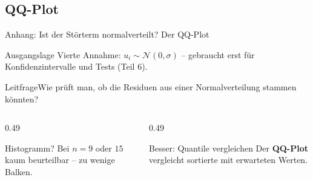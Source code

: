 \documentclass[aspectratio=169,11pt]{beamer}
\newcommand{\leitfrage}[1]{\begin{exampleblock}{Leitfrage}#1\end{exampleblock}}
\begin{document}
\subsection{QQ-Plot}

\begin{frame}{Anhang: Ist der Störterm normalverteilt? Der QQ-Plot}
  \begin{block}{Ausgangslage}
    Vierte Annahme: $u_i \sim \mathcal{N}(0,\sigma)$ -- gebraucht erst für
    Konfidenzintervalle und Tests (Teil 6).
  \end{block}

  \medskip

  \leitfrage{Wie prüft man, ob die Residuen aus einer Normalverteilung stammen könnten?}

  \medskip

  \begin{columns}[T]
    \begin{column}{0.49\textwidth}
      \begin{alertblock}{Histogramm?}
        Bei $n = 9$ oder $15$ kaum beurteilbar -- zu wenige Balken.
      \end{alertblock}
    \end{column}
    \begin{column}{0.49\textwidth}
      \begin{exampleblock}{Besser: Quantile vergleichen}
        Der \textbf{QQ-Plot} vergleicht sortierte mit erwarteten Werten.
      \end{exampleblock}
    \end{column}
  \end{columns}
\end{frame}
\end{document}
